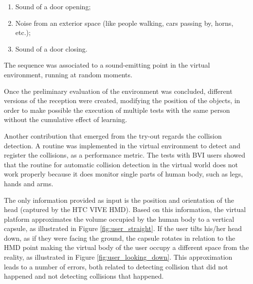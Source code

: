         \begin{enumerate}
            \item Sound of a door opening;
            \item Noise from an exterior space (like people walking, cars passing by, horns, etc.);
            \item Sound of a door closing.
        \end{enumerate}
        
        The sequence was associated to a sound-emitting point in the virtual environment, running at random moments. 

        Once the preliminary evaluation of the environment was concluded, different versions of the reception were created, modifying the position of the objects, in order to make possible the execution of multiple tests with the same person without the cumulative effect of learning. 

        Another contribution that emerged from the try-out regards the collision detection. A routine was implemented in the virtual environment to detect and register the collisions, as a performance metric. The tests with BVI users showed that the routine for automatic collision detection in the virtual world does not work properly because it does monitor single parts of human body, such as legs, hands and arms. 

        The only information provided as input is the position and orientation of the head (captured by the HTC VIVE HMD). Based on this information, the virtual platform approximates the volume occupied by the human body to a vertical capsule, as illustrated in Figure \ref{fig:user_straight}. If the user tilts his/her head down, as if they were facing the ground, the capsule rotates in relation to the HMD point making the virtual body of the user occupy a different space from the reality, as illustrated in Figure \ref{fig:user_looking_down}. This approximation leads to a number of errors, both related to detecting collision that did not happened and not detecting collisions that happened.

